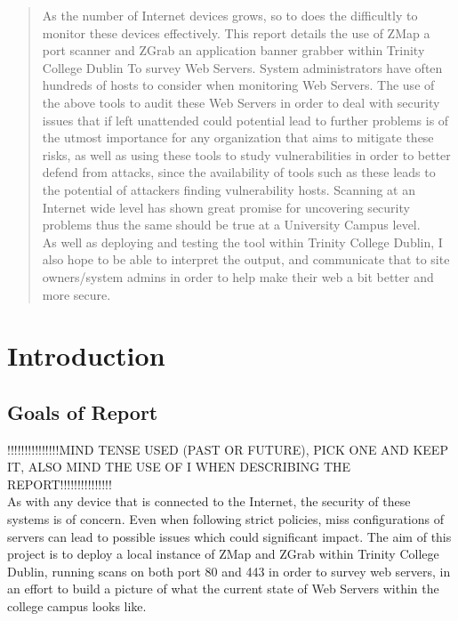 \documentclass[a4wide,leqno,12pt]{report}
\begin{document}
\begin{abstract}
\noindent
As the number of Internet devices grows, so to does the difficultly to monitor these devices effectively. This report details the use of ZMap a port scanner and ZGrab an application banner grabber within Trinity College Dublin To survey Web Servers. System administrators have often hundreds of hosts to consider when monitoring Web Servers. The use of the above tools to audit these Web Servers in order to deal with security issues that if left unattended could potential lead to further problems is of the utmost importance for any organization that aims to mitigate these risks, as well as using these tools to study vulnerabilities in order to better defend from attacks, since the availability of tools such as these leads to the potential of attackers finding vulnerability hosts. Scanning at an Internet wide level has shown great promise for uncovering security problems \cite{durumeric2015search} thus the same should be true at a University Campus level.\\

As well as deploying and testing the tool within Trinity College Dublin, I also hope to be able to interpret the output, and communicate that to site owners/system admins in order to help make their web a bit better and more secure.

\end{abstract}


\chapter{Introduction}
\section{Goals of Report}
!!!!!!!!!!!!!!!MIND TENSE USED (PAST OR FUTURE), PICK ONE AND KEEP IT, ALSO MIND THE USE OF I WHEN DESCRIBING THE REPORT!!!!!!!!!!!!!!!\\



As with any device that is connected to the Internet, the  security of these systems is of concern. Even when following strict policies,  miss configurations of servers can lead to possible issues which could significant impact. The aim of this project is to deploy a local instance of ZMap and ZGrab within Trinity College Dublin, running scans on both port 80 and 443 in order to survey web servers, in an effort to build a picture of what the current state of Web Servers within the college campus looks like.\\
\end{document}
